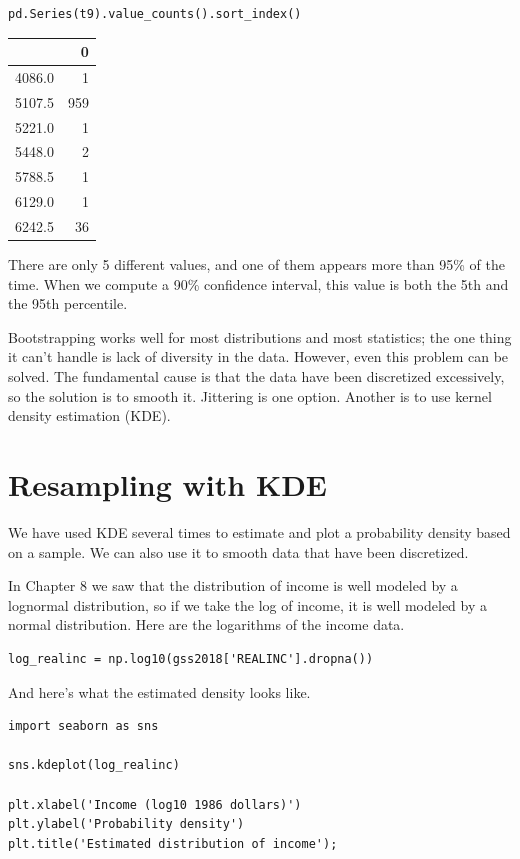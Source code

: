 \begin{lstlisting}[]
pd.Series(t9).value_counts().sort_index()
\end{lstlisting}

\begin{tabular}{lr}
\midrule
{} &    0 \\
\midrule
4086.0 &    1 \\
5107.5 &  959 \\
5221.0 &    1 \\
5448.0 &    2 \\
5788.5 &    1 \\
6129.0 &    1 \\
6242.5 &   36 \\
\midrule
\end{tabular}

There are only 5 different values, and one of them appears more than
95\% of the time. When we compute a 90\% confidence interval, this value
is both the 5th and the 95th percentile.

Bootstrapping works well for most distributions and most statistics; the
one thing it can't handle is lack of diversity in the data. However,
even this problem can be solved. The fundamental cause is that the data
have been discretized excessively, so the solution is to smooth it.
Jittering is one option. Another is to use kernel density estimation
(KDE).

\hypertarget{resampling-with-kde}{%
\section{Resampling with KDE}\label{resampling-with-kde}}

We have used KDE several times to estimate and plot a probability
density based on a sample. We can also use it to smooth data that have
been discretized.

In Chapter 8 we saw that the distribution of income is well modeled by a
lognormal distribution, so if we take the log of income, it is well
modeled by a normal distribution. Here are the logarithms of the income
data.

\begin{lstlisting}[]
log_realinc = np.log10(gss2018['REALINC'].dropna())
\end{lstlisting}

And here's what the estimated density looks like.

\begin{lstlisting}[]
import seaborn as sns

sns.kdeplot(log_realinc)

plt.xlabel('Income (log10 1986 dollars)')
plt.ylabel('Probability density')
plt.title('Estimated distribution of income');
\end{lstlisting}

